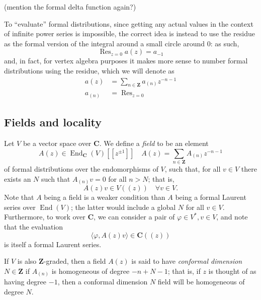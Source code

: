 \documentclass{article}
\newcommand{\CC}{\mathbold{C}}
\newcommand{\ZZ}{\mathbold{Z}}
\DeclareMathOperator{\Res}{Res}
\DeclareMathOperator{\End}{End}
\begin{document}
(mention the formal delta function again?)

To ``evaluate'' formal distributions, since getting any actual values in the context of infinite power series is impossible, the correct idea is instead to use the residue as the formal version of the integral around a small circle around $0$: as such, 
\[\Res_{z=0}a(z)=a_{-1} \]
and, in fact, for vertex algebra purposes it makes more sense to number formal distributions using the residue, which we will denote as
\begin{align*}
  a(z)&=\sum_{n \in \ZZ}a_{(n)}z^{-n-1}\\
  a_{(n)}&=\Res_{z=0}
\end{align*}

\subsection{Fields and locality}
Let $V$ be a vector space over $\CC$.  We define a \textit{field} to be an element
\[A(z) \in \End_\CC(V)[[z^{\pm 1}]] \quad A(z)=\sum_{n \in \ZZ} A_{(n)}z^{-n-1} \]
of formal distributions over the endomorphisms of $V$, such that, for all $v \in V$ there exists an $N$ such that $A_{(n)}v=0$ for all $n>N$; that is, 
\[A(z)v \in V((z)) \quad \forall v \in V. \]
Note that $A$ being a field is a weaker condition than $A$ being a formal Laurent series over $\End(V)$; the latter would include a global $N$ for all $v \in V$.  Furthermore, to work over $\CC$, we can consider a pair of $\varphi \in V^*, v \in V$, and note that the evaluation
\[\langle \varphi, A(z)v \rangle \in \CC((z)) \]
is itself a formal Laurent series.

If $V$ is also $\ZZ$-graded, then a field $A(z)$ is said to have \textit{conformal dimension} $N \in \ZZ$ if $A_{(n)}$ is homogeneous of degree $-n+N-1$; that is, if $z$ is thought of as having degree $-1$, then a conformal dimension $N$ field will be homogeneous of degree $N$.
\end{document}
